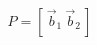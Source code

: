 \documentclass[preview]{standalone}
\begin{document}
\begin{align*}
P=[\,\vec b_1\ \vec b_2\,]
\end{align*}
\end{document}

